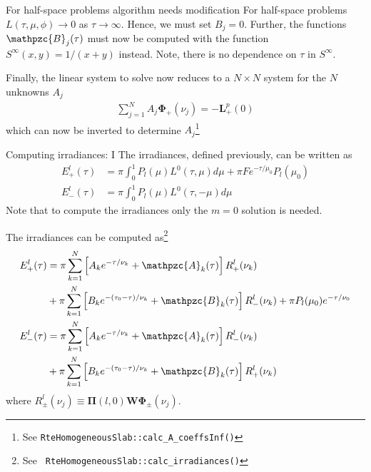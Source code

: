 \documentclass[14]{beamer}
\newcommand{\mvec}[1]{\mathbf{#1}}
\newcommand{\gvec}[1]{\boldsymbol{#1}}
\newcommand{\script}[1]{\mathpzc{#1}}
\begin{document}
\begin{frame}{For half-space problems algorithm needs modification}
  For half-space problems $L(\tau,\mu,\phi) \rightarrow 0$ as $\tau
  \rightarrow \infty$. Hence, we must set $B_j = 0$. Further, the
  functions $\script{B}_j(\tau)$ must now be computed with the
  function $S^\infty(x,y) = 1/(x+y)$ instead. Note, there is no
  dependence on $\tau$ in $S^\infty$.

  Finally, the linear system to solve now reduces to a $N\times N$
  system for the $N$ unknowns $A_j$
  \begin{align}
    \sum_{j=1}^N
      A_j \gvec{\Phi}_+(\nu_j) = -\mvec{L}_+^p(0)
  \end{align}
  which can now be inverted to determine $A_j$\footnote{See
    {\tt RteHomogeneousSlab::calc\_A\_coeffsInf()}}
\end{frame}

\begin{frame}{Computing irradiances: I}
  The irradiances, defined previously, can be written as
  \begin{align}
    E_+^l(\tau) &= \pi \int_0^1
     P_l(\mu) L^0(\tau,\mu) d\mu
    + \pi F e^{-\tau/\mu_0} P_l(\mu_0) \\
    E_-^l(\tau) &= \pi \int_0^1
    P_l(\mu) L^0(\tau,-\mu) d\mu
  \end{align}
  Note that to compute the irradiances only the $m=0$ solution is
  needed. 
\end{frame}

\begin{frame}{The irradiances can be computed as\footnote{See {\tt
        RteHomogeneousSlab::calc\_irradiances()}}}
  \begin{align}
    E_+^l(\tau) &= \pi \sum_{k=1}^N
    \left[
      A_k e^{-\tau/\nu_k} + \script{A}_k(\tau)
    \right] R_+^l(\nu_k) \notag \\
    &+ \pi \sum_{k=1}^N
    \left[
      B_k e^{-(\tau_0-\tau)/\nu_k} + \script{B}_k(\tau)
    \right] R_-^l(\nu_k)
    + \pi P_l(\mu_0) e^{-\tau/\nu_0} \\
    E_-^l(\tau) &= \pi \sum_{k=1}^N
    \left[
      A_k e^{-\tau/\nu_k} + \script{A}_k(\tau)
    \right] R_-^l(\nu_k) \notag \\
    &+ \pi \sum_{k=1}^N
    \left[
      B_k e^{-(\tau_0-\tau)/\nu_k} + \script{B}_k(\tau)
    \right] R_+^l(\nu_k)
  \end{align}
  where $R_\pm^l(\nu_j) \equiv \mvec{\Pi}(l,0) \mvec{W}
  \gvec{\Phi}_\pm(\nu_j)$.
\end{frame}
\end{document}
